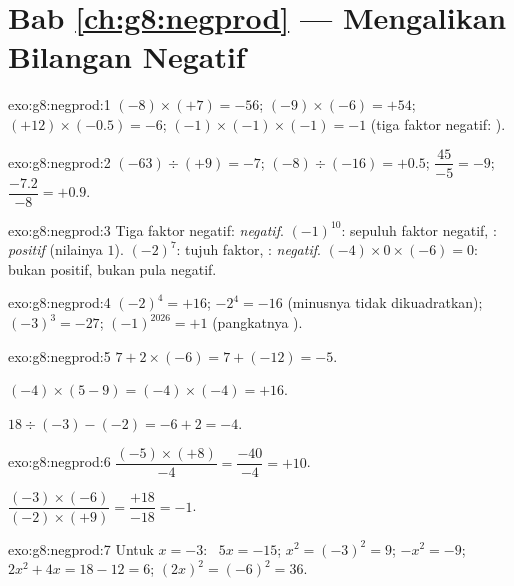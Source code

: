 \section*{Bab \ref{ch:g8:negprod} --- Mengalikan Bilangan Negatif}

\begin{solution}{exo:g8:negprod:1}
$(-8) \times (+7) = -56$; \quad
$(-9) \times (-6) = +54$; \quad
$(+12) \times (-0.5) = -6$; \quad
$(-1) \times (-1) \times (-1) = -1$ (tiga faktor negatif: ).
\end{solution}

\begin{solution}{exo:g8:negprod:2}
$(-63) \div (+9) = -7$; \quad
$(-8) \div (-16) = +0.5$; \quad
$\dfrac{45}{-5} = -9$; \quad
$\dfrac{-7.2}{-8} = +0.9$.
\end{solution}

\begin{solution}{exo:g8:negprod:3}
Tiga faktor negatif: \emph{negatif}. \quad
$(-1)^{10}$: sepuluh faktor negatif, : \emph{positif} (nilainya
$1$). \quad
$(-2)^7$: tujuh faktor, : \emph{negatif}. \quad
$(-4) \times 0 \times (-6) = 0$: bukan positif, bukan pula negatif.
\end{solution}

\begin{solution}{exo:g8:negprod:4}
$(-2)^4 = +16$; \quad $-2^4 = -16$ (minusnya tidak dikuadratkan); \quad
$(-3)^3 = -27$; \quad $(-1)^{2026} = +1$ (pangkatnya ).
\end{solution}

\begin{solution}{exo:g8:negprod:5}
$7 + 2 \times (-6) = 7 + (-12) = -5$.

$(-4) \times (5 - 9) = (-4) \times (-4) = +16$.

$18 \div (-3) - (-2) = -6 + 2 = -4$.
\end{solution}

\begin{solution}{exo:g8:negprod:6}
$\dfrac{(-5) \times (+8)}{-4} = \dfrac{-40}{-4} = +10$.

$\dfrac{(-3) \times (-6)}{(-2) \times (+9)} = \dfrac{+18}{-18} = -1$.
\end{solution}

\begin{solution}{exo:g8:negprod:7}
Untuk $x = -3$: \ $5x = -15$; \quad $x^2 = (-3)^2 = 9$; \quad
$-x^2 = -9$; \quad $2x^2 + 4x = 18 - 12 = 6$; \quad
$(2x)^2 = (-6)^2 = 36$.
\end{solution}

